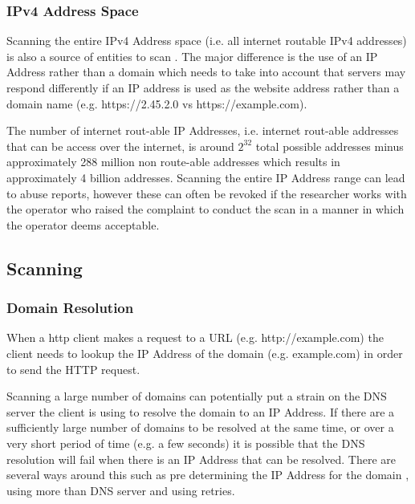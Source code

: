 \documentclass{mscreport}
\begin{document}
\subsubsection{IPv4 Address Space}

Scanning the entire IPv4 Address space (i.e. all internet routable IPv4 addresses) is also a source of entities to scan \cite{Kotzias2018-wd}. The major difference is the use of an IP Address rather than a domain which needs to take into account that servers may respond differently if an IP address is used as the website address rather than a domain name (e.g. https://2.45.2.0 vs https://example.com).

\vspace{0.3cm} \noindent
The number of internet rout-able IP Addresses, i.e. internet rout-able addresses that can be access over the internet, is around \(2^{32}\) total possible addresses minus approximately 288 million non route-able addresses which results in approximately 4 billion addresses. Scanning the entire IP Address range can lead to abuse reports, however these can often be revoked if the researcher works with the operator who raised the complaint to conduct the scan in a manner in which the operator deems acceptable.

\subsection{Scanning}

\subsubsection{Domain Resolution}

When a http client makes a request to a URL (e.g. http://example.com) the client needs to lookup the IP Address of the domain (e.g. example.com) in order to send the HTTP request.

\vspace{0.3cm} \noindent
Scanning a large number of domains can potentially put a strain on the DNS server the client is using to resolve the domain to an IP Address. If there are a sufficiently large number of domains to be resolved at the same time, or over a very short period of time (e.g. a few seconds) it is possible that the DNS resolution will fail when there is an IP Address that can be resolved. There are several ways around this such as pre determining the IP Address for the domain \cite{Amann2017-co}, using more than DNS server and using retries.
\end{document}
